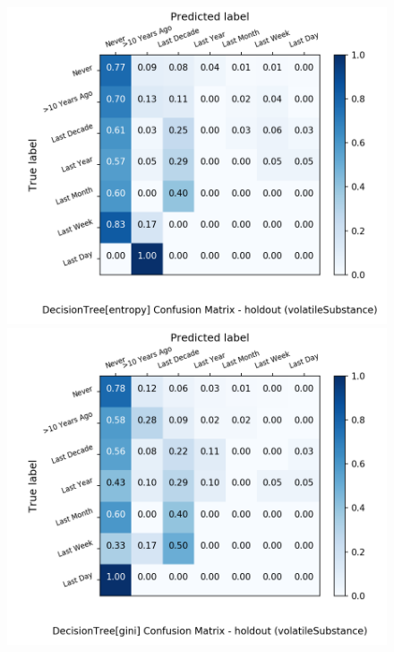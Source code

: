 \begin{figure}[H]
	\centering
	\begin{minipage}[b]{0.32\textwidth}
		\includegraphics[width=1.1\textwidth]{Plots/drugs/volatileSubstance_DecisionTree_entropy_balance_False_holdout.png}
	\end{minipage}
	\begin{minipage}[b]{0.32\textwidth}
		\includegraphics[width=1.1\textwidth]{Plots/drugs/volatileSubstance_DecisionTree_gini_balance_False_holdout.png}
	\end{minipage}

\end{figure}
